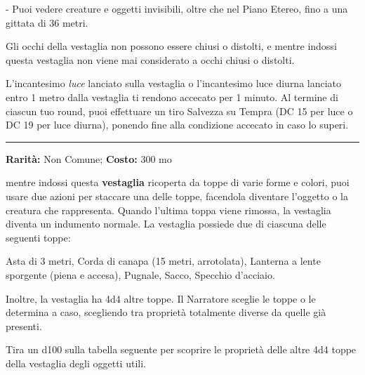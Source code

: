 \begin{multicols}{2}
- Puoi vedere creature e oggetti invisibili, oltre che nel Piano Etereo, fino a una gittata di 36 metri.

Gli occhi della vestaglia non possono essere chiusi o distolti, e mentre indossi questa vestaglia non viene mai considerato a occhi chiusi o distolti.

L'incantesimo \emph{luce} lanciato sulla vestaglia o l'incantesimo luce diurna lanciato entro 1 metro dalla vestaglia ti rendono accecato per 1 minuto. Al termine di ciascun tuo round, puoi effettuare un tiro Salvezza su Tempra (DC 15 per luce o DC 19 per luce diurna), ponendo fine alla condizione accecato in caso lo superi.

\smallskip\noindent\rule{\linewidth}{2pt}  \hypertarget{TunicadegliOggettiUtili}{}\smallskip{}\noindent\label{TunicadegliOggettiUtili}

\textbf{Rarità:} Non Comune; \textbf{Costo:} 300 mo

mentre indossi questa \textbf{vestaglia} ricoperta da toppe di varie forme e colori, puoi usare due azioni per staccare una delle toppe, facendola diventare l'oggetto o la creatura che rappresenta. Quando l'ultima toppa viene rimossa, la vestaglia diventa un indumento normale. La vestaglia possiede due di ciascuna delle seguenti toppe:

Asta di 3 metri, Corda di canapa (15 metri, arrotolata), Lanterna a lente sporgente (piena e accesa), Pugnale, Sacco, Specchio d'acciaio.

Inoltre, la vestaglia ha 4d4 altre toppe. Il Narratore sceglie le toppe o le determina a caso, scegliendo tra proprietà totalmente diverse da quelle già presenti.

Tira un d100 sulla tabella seguente per scoprire le proprietà delle altre 4d4 toppe della vestaglia degli oggetti utili.


\medskip


\end{multicols}
